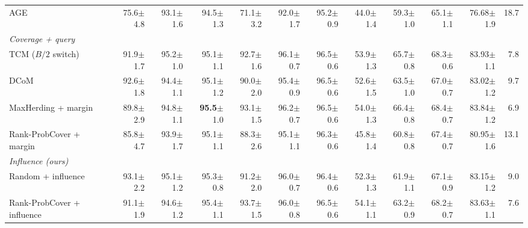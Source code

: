 \begin{table}[t]
\begin{adjustbox}{max width=\textwidth}
\begin{tabular}{lrrrrrrrrrrr}
\quad AGE~\cite{cai2017active} & 75.6{\scriptsize$\pm$4.8} & 93.1{\scriptsize$\pm$1.6} & 94.5{\scriptsize$\pm$1.3} & 71.1{\scriptsize$\pm$3.2} & 92.0{\scriptsize$\pm$1.7} & 95.2{\scriptsize$\pm$0.9} & 44.0{\scriptsize$\pm$1.4} & 59.3{\scriptsize$\pm$1.0} & 65.1{\scriptsize$\pm$1.1} & 76.68{\scriptsize$\pm$1.9} & 18.7 \\
\multicolumn{12}{l}{\textit{Coverage + query}} \\
\quad TCM ($B/2$ switch)~\cite{doucet2024bridging} & 91.9{\scriptsize$\pm$1.7} & 95.2{\scriptsize$\pm$1.0} & 95.1{\scriptsize$\pm$1.1} & 92.7{\scriptsize$\pm$1.6} & 96.1{\scriptsize$\pm$0.7} & 96.5{\scriptsize$\pm$0.6} & 53.9{\scriptsize$\pm$1.3} & 65.7{\scriptsize$\pm$0.8} & 68.3{\scriptsize$\pm$0.6} & 83.93{\scriptsize$\pm$1.1} & 7.8 \\
\quad DCoM~\cite{mishal2024dcom} & 92.6{\scriptsize$\pm$1.8} & 94.4{\scriptsize$\pm$1.1} & 95.1{\scriptsize$\pm$1.2} & 90.0{\scriptsize$\pm$2.0} & 95.4{\scriptsize$\pm$0.9} & 96.5{\scriptsize$\pm$0.6} & 52.6{\scriptsize$\pm$1.5} & 63.5{\scriptsize$\pm$1.0} & 67.0{\scriptsize$\pm$0.7} & 83.02{\scriptsize$\pm$1.2} & 9.7 \\
\quad MaxHerding + margin & 89.8{\scriptsize$\pm$2.9} & 94.8{\scriptsize$\pm$1.1} & \textbf{95.5}{\scriptsize$\pm$1.0} & 93.1{\scriptsize$\pm$1.5} & 96.2{\scriptsize$\pm$0.7} & 96.5{\scriptsize$\pm$0.6} & 54.0{\scriptsize$\pm$1.3} & 66.4{\scriptsize$\pm$0.8} & 68.4{\scriptsize$\pm$0.7} & 83.84{\scriptsize$\pm$1.2} & 6.9 \\
\quad Rank-ProbCover + margin & 85.8{\scriptsize$\pm$4.7} & 93.9{\scriptsize$\pm$1.7} & 95.1{\scriptsize$\pm$1.1} & 88.3{\scriptsize$\pm$2.6} & 95.1{\scriptsize$\pm$1.1} & 96.3{\scriptsize$\pm$0.6} & 45.8{\scriptsize$\pm$1.4} & 60.8{\scriptsize$\pm$0.8} & 67.4{\scriptsize$\pm$0.7} & 80.95{\scriptsize$\pm$1.6} & 13.1 \\
\multicolumn{12}{l}{\textit{Influence (ours)}} \\
\quad Random + influence & 93.1{\scriptsize$\pm$2.2} & 95.1{\scriptsize$\pm$1.2} & 95.3{\scriptsize$\pm$0.8} & 91.2{\scriptsize$\pm$2.0} & 96.0{\scriptsize$\pm$0.7} & 96.4{\scriptsize$\pm$0.6} & 52.3{\scriptsize$\pm$1.3} & 61.9{\scriptsize$\pm$1.1} & 67.1{\scriptsize$\pm$0.9} & 83.15{\scriptsize$\pm$1.2} & 9.0 \\
\quad Rank-ProbCover + influence & 91.1{\scriptsize$\pm$1.9} & 94.6{\scriptsize$\pm$1.2} & 95.4{\scriptsize$\pm$1.1} & 93.7{\scriptsize$\pm$1.5} & 96.0{\scriptsize$\pm$0.8} & 96.5{\scriptsize$\pm$0.6} & 54.1{\scriptsize$\pm$1.1} & 63.2{\scriptsize$\pm$0.9} & 68.2{\scriptsize$\pm$0.7} & 83.63{\scriptsize$\pm$1.1} & 7.6 \\

\end{tabular}
\end{adjustbox}
\end{table}
